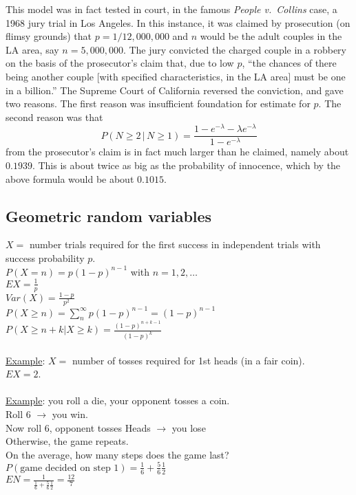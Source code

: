 This model was in fact tested in court, in the famous {\it 
People v.~Collins\/} case, a 1968 jury trial in Los Angeles. In this instance,  
it was claimed by prosecution (on flimsy grounds) that 
$p=1/12,000,000$ and $n$ would be the adult couples in the LA area, 
say $n=5,000,000$. The jury convicted the charged couple in a robbery 
on the basis of the prosecutor's claim that, due to low $p$, ``the chances of there 
being another couple [with specified characteristics, in the LA area]
must be one in a billion.'' The Supreme Court of California reversed 
the conviction, and gave two reasons. The first reason was insufficient foundation 
for estimate for $p$. The second reason was that 
$$
P(N\ge 2\,|\, N\ge 1)=\frac{1-e^{-\lambda}-\lambda e^{-\lambda}}{1-e^{-\lambda}}
$$ 
from the prosecutor's claim is in fact much larger than he claimed,
namely about $0.1939$. This
is about twice as big as the probability of innocence, which 
by the above formula would be about $0.1015$. 
  \subsection*{Geometric random variables}
    $X =$ number trials required for the first success in independent trials
    with success probability $p$.\\
    $P(X = n) = p(1-p)^{n-1}$ with $n = 1, 2, \ldots$\\
    $EX = \frac{1}{p}$\\
    $Var(X) = \frac{1-p}{p^2}$\\
    $P(X \ge n) = \sum_{n}^{\infty} p(1-p)^{n-1} = (1-p)^{n-1}$\\
    $P(X \ge n + k | X \ge k) = \frac{(1-p)^{n+k-1}}{(1-p)^{k}}$\\\\
    \underline{Example}: $X = $ number of tosses required for 1st heads (in
    a fair coin).\\
      $EX = 2$.\\\\
    \underline{Example}: you roll a die, your opponent tosses a coin.\\
    Roll 6 $\to$ you win.\\
    Now roll 6, opponent tosses Heads $\to$ you lose\\
    Otherwise, the game repeats.\\
    On the average, how many steps does the game last?\\
    $P(\text{game decided on step 1}) = \frac{1}{6} + \frac{5}{6}\frac{1}{2}$\\
    $EN = \frac{1}{\frac{1}{6} + \frac{5}{6}\frac{1}{2}} = \frac{12}{7}$

